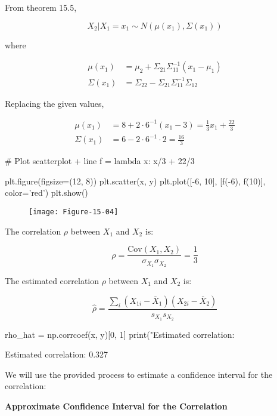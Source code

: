 From theorem 15.5,

\[ X_2 | X_1 = x_1 \sim N(\mu(x_1), \Sigma(x_1))\]

where

\begin{align}
\mu(x_1) &= \mu_2 + \Sigma_{21} \Sigma_{11}^{-1} (x_1 - \mu_1) \\
\Sigma(x_1) &= \Sigma_{22} - \Sigma_{21}\Sigma_{11}^{-1}\Sigma_{12}
\end{align}

Replacing the given values,

\begin{align}
\mu(x_1) &= 8 + 2 \cdot 6^{-1} (x_1 - 3) = \frac{1}{3} x_1 + \frac{22}{3}\\
\Sigma(x_1) &= 6 - 2 \cdot 6^{-1} \cdot 2 = \frac{16}{3}
\end{align}

\begin{python}
# Plot scatterplot + line
f = lambda x: x/3 + 22/3

plt.figure(figsize=(12, 8))
plt.scatter(x, y)
plt.plot([-6, 10], [f(-6), f(10)], color='red')
plt.show()
\end{python}

\begin{figure}[H]
\texttt{[image: Figure-15-04]}
\end{figure}

The correlation \(\rho\) between \(X_1\) and \(X_2\) is:

\[ \rho = \frac{\text{Cov}(X_1, X_2)}{\sigma_{X_1} \sigma_{X_2}} = \frac{1}{3}\]

The estimated correlation \(\rho\) between \(X_1\) and \(X_2\) is:

\[ \hat{\rho} = \frac{\sum_i (X_{1i} - \overline{X}_1)(X_{2i} - \overline{X}_2)}{s_{X_1} s_{X_2}}\]

\begin{python}
rho_hat = np.corrcoef(x, y)[0, 1]
print("Estimated correlation: %
\end{python}

\begin{console}
Estimated correlation: 0.327
\end{console}

We will use the provided process to estimate a confidence interval for
the correlation:

\textbf{Approximate Confidence Interval for the Correlation}

